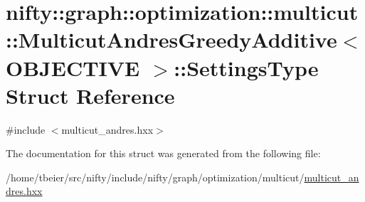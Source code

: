 \hypertarget{structnifty_1_1graph_1_1optimization_1_1multicut_1_1MulticutAndresGreedyAdditive_1_1SettingsType}{}\section{nifty\+:\+:graph\+:\+:optimization\+:\+:multicut\+:\+:Multicut\+Andres\+Greedy\+Additive$<$ O\+B\+J\+E\+C\+T\+I\+V\+E $>$\+:\+:Settings\+Type Struct Reference}
\label{structnifty_1_1graph_1_1optimization_1_1multicut_1_1MulticutAndresGreedyAdditive_1_1SettingsType}


{\ttfamily \#include $<$multicut\+\_\+andres.\+hxx$>$}



The documentation for this struct was generated from the following file\+:\begin{DoxyCompactItemize}
\item 
/home/tbeier/src/nifty/include/nifty/graph/optimization/multicut/\hyperlink{multicut__andres_8hxx}{multicut\+\_\+andres.\+hxx}\end{DoxyCompactItemize}
